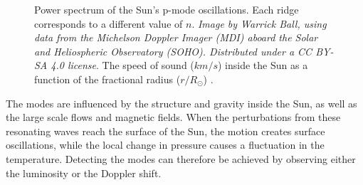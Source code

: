 \documentclass[11pt,a4paper,onecolumn]{report}
\begin{document}
\begin{figure}[t]
  \centering
   \caption{ Power spectrum of the Sun's p-mode
  oscillations. Each ridge corresponds to a different value of \(n\).
  \textit{Image by Warrick Ball, using data from the Michelson Doppler Imager
  (MDI) aboard the Solar and Heliospheric Observatory (SOHO). Distributed under
  a CC BY-SA 4.0 license}.  The speed of sound
  (\(\si{km\per s}\)) inside the Sun as a function of the fractional radius
  (\(\si{r \per R_\odot}\)) \citep{bahcall_solar_2000}.}

\end{figure}

The modes are influenced by the structure and gravity inside the Sun, as well as
the large scale flows and magnetic fields. When the perturbations from these
resonating waves reach the surface of the Sun, the motion creates surface
oscillations, while the local change in pressure causes a fluctuation in the
temperature. Detecting the modes can therefore be achieved by observing either
the luminosity or the Doppler shift.\\
\end{document}
